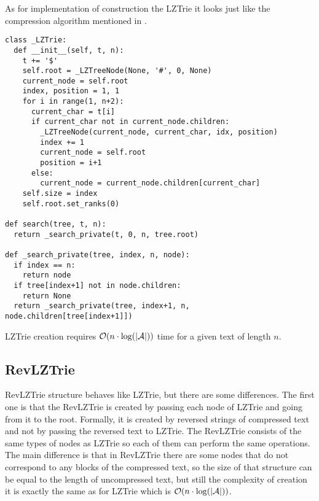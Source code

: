 As for implementation of construction the LZTrie it looks just like the compression algorithm mentioned in .

\begin{verbatim}
class _LZTrie:
  def __init__(self, t, n):
    t += '$'
    self.root = _LZTreeNode(None, '#', 0, None)
    current_node = self.root
    index, position = 1, 1
    for i in range(1, n+2):
      current_char = t[i]
      if current_char not in current_node.children:
        _LZTreeNode(current_node, current_char, idx, position)
        index += 1
        current_node = self.root
        position = i+1
      else:
        current_node = current_node.children[current_char]
    self.size = index
    self.root.set_ranks(0)

def search(tree, t, n):
  return _search_private(t, 0, n, tree.root)

def _search_private(tree, index, n, node):
  if index == n:
    return node
  if tree[index+1] not in node.children:
    return None
  return _search_private(tree, index+1, n, node.children[tree[index+1]])
\end{verbatim}

LZTrie creation requires $\mathcal{O}(n \cdot \log (|\mathcal{A}|))$ time for a given text of length $n$.

\subsection{RevLZTrie}
RevLZTrie structure behaves like LZTrie, but there are some differences. The first one is that the RevLZTrie is created by passing each node of LZTrie and going from it to the root. Formally, it is created by reversed strings of compressed text and not by passing the reversed text to LZTrie. The RevLZTrie consists of the same types of nodes as LZTrie so each of them can perform the same operations. The main difference is that in RevLZTrie there are some nodes that do not correspond to any blocks of the compressed text, so the size of that structure can be equal to the length of uncompressed text, but still the complexity of creation it is exactly the same as for LZTrie which is $\mathcal{O}(n \cdot \log (|\mathcal{A}|))$. 
\begin{center}
\end{center}

